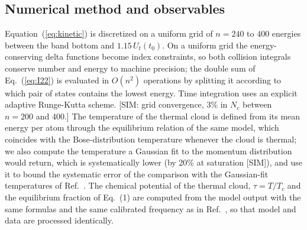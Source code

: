 \subsection{Numerical method and observables}
Equation~(\ref{eq:kinetic}) is discretized on a uniform grid of $n=240$ to $400$
energies between the band bottom and $1.15\,U_t(t_0)$. On a uniform grid the
energy-conserving delta functions become index constraints, so both collision
integrals conserve number and energy to machine precision; the double sum of
Eq.~(\ref{eq:I22}) is evaluated in $O(n^2)$ operations by splitting it
according to which pair of states contains the lowest energy. Time integration
uses an explicit adaptive Runge-Kutta scheme. [SIM: grid convergence, 3\% in
$N_c$ between $n=200$ and 400.] The temperature of the thermal cloud is defined
from its mean energy per atom through the equilibrium relation of the same
model, which coincides with the Bose-distribution temperature whenever the
cloud is thermal; we also compute the temperature a Gaussian fit to the
momentum distribution would return, which is systematically lower (by 20\% at
saturation [SIM]), and use it to bound the systematic error of the comparison
with the Gaussian-fit temperatures of Ref.~\cite{MelladoMunoz2020}. The
chemical potential of the thermal cloud, $\tau=T/T_c$ and the equilibrium
fraction of Eq.~(1) are computed from the model output with the same
formulas and the same calibrated frequency as in Ref.~\cite{MelladoMunoz2020},
so that model and data are processed identically.
